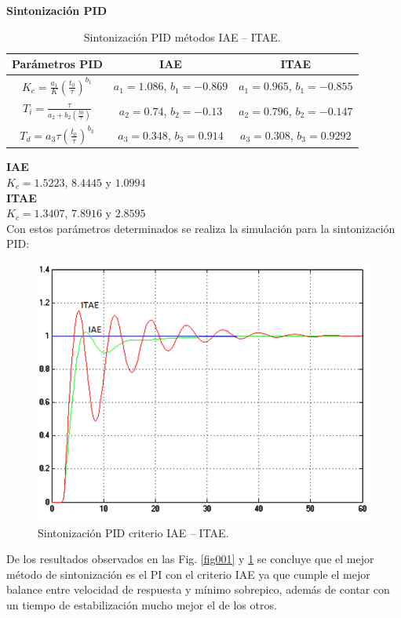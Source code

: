 \documentclass[twocolumn]{IEEEtran}
\begin{document}
\noindent
\textbf{Sintonización PID}
\begin{table}[H]
	\centering
\begin{tabular}{|c|c|c|}\hline
\textbf{Parámetros PID} & \textbf{IAE} & \textbf{ITAE} \\ \hline
$K_c=\frac{{a_1 }}{K}\left( {\frac{{t_0 }}{\tau }} \right)^{b_1 }$ & $a_1=1.086$, $b_1=-0.869$ & $a_1=0.965$, $b_1=-0.855$ \\ \hline
$T_i  = \frac{\tau }{{a_2  + b_2 \left( {\frac{{t0}}{\tau }} \right)}}$ & $a_2=0.74$, $b_2=-0.13$ & $a_2=0.796$, $b_2=-0.147$ \\ \hline
$T_d  = a_3 \tau \left( {\frac{{t_0 }}{\tau }} \right)^{b_3 } $ & $a_3=0.348$, $b_3=0.914$ & $a_3=0.308$, $b_3=0.9292$ \\ \hline
    \end{tabular}
	\caption{Sintonización PID métodos IAE – ITAE.}
	\label{tab5}
\end{table}
\noindent
\textbf{IAE}\\
$K_c=1.5223$, $8.4445$ y $1.0994$\\
\textbf{ITAE}\\
$K_c=1.3407$, $7.8916$ y $2.8595$\\
Con estos parámetros determinados se realiza la simulación para la sintonización PID:
\begin{figure}[H]
	\centering
		\includegraphics[scale=0.28]{2.png}
	\caption{Sintonización PID criterio IAE – ITAE.}
	\label{fig002}
\end{figure}
\noindent
De los resultados observados en las Fig. \ref{fig001} y \ref{fig002} se concluye que el mejor método de sintonización es el PI con el criterio IAE ya que cumple el mejor balance entre velocidad de respuesta y mínimo sobrepico, además de contar con un tiempo de estabilización mucho mejor el de  los otros.
\end{document}

